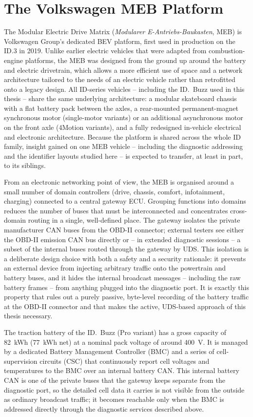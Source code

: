 \documentclass[11pt,a4paper,oneside,parskip=half]{scrreprt}
\begin{document}
\section{The Volkswagen MEB Platform}
The Modular Electric Drive Matrix (\textit{Modularer E-Antriebs-Baukasten}, MEB) is Volkswagen Group's dedicated BEV platform, first used in production on the ID.3 in 2019. Unlike earlier electric vehicles that were adapted from combustion-engine platforms, the MEB was designed from the ground up around the battery and electric drivetrain, which allows a more efficient use of space and a network architecture tailored to the needs of an electric vehicle rather than retrofitted onto a legacy design. All ID-series vehicles -- including the ID.~Buzz used in this thesis -- share the same underlying architecture: a modular skateboard chassis with a flat battery pack between the axles, a rear-mounted permanent-magnet synchronous motor (single-motor variants) or an additional asynchronous motor on the front axle (4Motion variants), and a fully redesigned in-vehicle electrical and electronic architecture. Because the platform is shared across the whole ID family, insight gained on one MEB vehicle -- including the diagnostic addressing and the identifier layouts studied here -- is expected to transfer, at least in part, to its siblings.

From an electronic networking point of view, the MEB is organised around a small number of domain controllers (drive, chassis, comfort, infotainment, charging) connected to a central gateway ECU. Grouping functions into domains reduces the number of buses that must be interconnected and concentrates cross-domain routing in a single, well-defined place. The gateway isolates the private manufacturer CAN buses from the OBD-II connector; external testers see either the OBD-II emission CAN bus directly or -- in extended diagnostic sessions -- a subset of the internal buses routed through the gateway by UDS. This isolation is a deliberate design choice with both a safety and a security rationale: it prevents an external device from injecting arbitrary traffic onto the powertrain and battery buses, and it hides the internal broadcast messages -- including the raw battery frames -- from anything plugged into the diagnostic port. It is exactly this property that rules out a purely passive, byte-level recording of the battery traffic at the OBD-II connector and that makes the active, UDS-based approach of this thesis necessary.

The traction battery of the ID.~Buzz (Pro variant) has a gross capacity of 82~kWh (77~kWh net) at a nominal pack voltage of around 400~V. It is managed by a dedicated Battery Management Controller (BMC) and a series of cell-supervision circuits (CSC) that continuously report cell voltages and temperatures to the BMC over an internal battery CAN. This internal battery CAN is one of the private buses that the gateway keeps separate from the diagnostic port, so the detailed cell data it carries is not visible from the outside as ordinary broadcast traffic; it becomes reachable only when the BMC is addressed directly through the diagnostic services described above.
\end{document}
